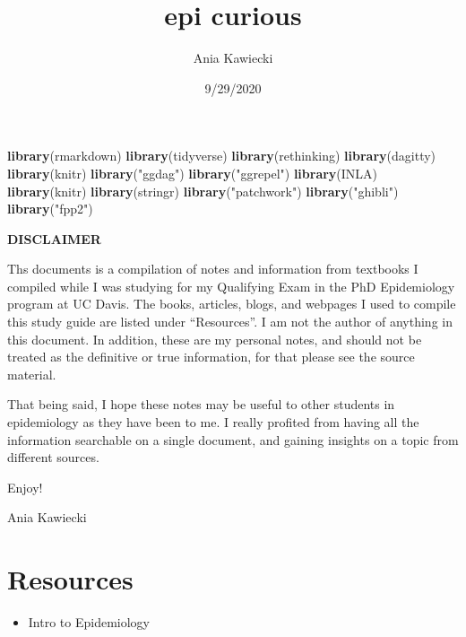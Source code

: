 \documentclass[
]{article}
\title{epi curious}
\author{Ania Kawiecki}
\date{9/29/2020}
\newenvironment{Shaded}{\begin{snugshade}}{\end{snugshade}}
\newcommand{\KeywordTok}[1]{\textcolor[rgb]{0.13,0.29,0.53}{\textbf{#1}}}
\newcommand{\NormalTok}[1]{#1}
\newcommand{\StringTok}[1]{\textcolor[rgb]{0.31,0.60,0.02}{#1}}
\providecommand{\tightlist}{%
  \setlength{\itemsep}{0pt}\setlength{\parskip}{0pt}}
\begin{document}
\maketitle

{
\setcounter{tocdepth}{2}
\tableofcontents
}
\begin{Shaded}
\begin{Highlighting}[]
\KeywordTok{library}\NormalTok{(rmarkdown)}
\KeywordTok{library}\NormalTok{(tidyverse)}
\KeywordTok{library}\NormalTok{(rethinking)}
\KeywordTok{library}\NormalTok{(dagitty)}
\KeywordTok{library}\NormalTok{(knitr)}
\KeywordTok{library}\NormalTok{(}\StringTok{"ggdag"}\NormalTok{)}
\KeywordTok{library}\NormalTok{(}\StringTok{"ggrepel"}\NormalTok{)}
\KeywordTok{library}\NormalTok{(INLA)}
\KeywordTok{library}\NormalTok{(knitr)}
\KeywordTok{library}\NormalTok{(stringr)}
\KeywordTok{library}\NormalTok{(}\StringTok{"patchwork"}\NormalTok{)}
\KeywordTok{library}\NormalTok{(}\StringTok{"ghibli"}\NormalTok{)}
\KeywordTok{library}\NormalTok{(}\StringTok{"fpp2"}\NormalTok{)}
\end{Highlighting}
\end{Shaded}

\textbf{DISCLAIMER}

Ths documents is a compilation of notes and information from textbooks I
compiled while I was studying for my Qualifying Exam in the PhD
Epidemiology program at UC Davis. The books, articles, blogs, and
webpages I used to compile this study guide are listed under
``Resources''. I am not the author of anything in this document. In
addition, these are my personal notes, and should not be treated as the
definitive or true information, for that please see the source material.

That being said, I hope these notes may be useful to other students in
epidemiology as they have been to me. I really profited from having all
the information searchable on a single document, and gaining insights on
a topic from different sources.

Enjoy!

Ania Kawiecki

\hypertarget{resources}{%
\section{Resources}\label{resources}}

\begin{itemize}
\tightlist
\item
  Intro to Epidemiology
\end{itemize}
\end{document}
